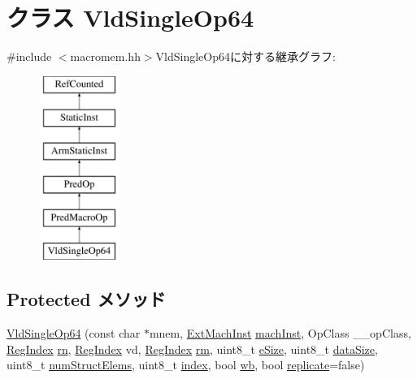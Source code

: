 \hypertarget{classArmISA_1_1VldSingleOp64}{
\section{クラス VldSingleOp64}
\label{classArmISA_1_1VldSingleOp64}
}


{\ttfamily \#include $<$macromem.hh$>$}VldSingleOp64に対する継承グラフ:\begin{figure}[H]
\begin{center}
\leavevmode
\includegraphics[height=6cm]{classArmISA_1_1VldSingleOp64}
\end{center}
\end{figure}
\subsection*{Protected メソッド}
\begin{DoxyCompactItemize}
\item 
\hyperlink{classArmISA_1_1VldSingleOp64_a61720536a7dbaa8cf1551561689ec645}{VldSingleOp64} (const char $\ast$mnem, \hyperlink{classStaticInst_a5605d4fc727eae9e595325c90c0ec108}{ExtMachInst} \hyperlink{classStaticInst_a744598b194ca3d4201d9414ce4cc4af4}{machInst}, OpClass \_\-\_\-opClass, \hyperlink{classStaticInst_a36d25e03e43fa3bb4c5482cbefe5e0fb}{RegIndex} \hyperlink{namespaceArmISA_adf8c6c579ad8729095a637a4f2181211}{rn}, \hyperlink{classStaticInst_a36d25e03e43fa3bb4c5482cbefe5e0fb}{RegIndex} vd, \hyperlink{classStaticInst_a36d25e03e43fa3bb4c5482cbefe5e0fb}{RegIndex} \hyperlink{namespaceArmISA_ad546c2cf2168cf2d8ac21b2a9f485e82}{rm}, uint8\_\-t \hyperlink{classArmISA_1_1VldSingleOp64_aac129ded07ba57383c5e2540f22c94ef}{eSize}, uint8\_\-t \hyperlink{classArmISA_1_1VldSingleOp64_af13e629a2f79d14821c7b9246ef99e9f}{dataSize}, uint8\_\-t \hyperlink{classArmISA_1_1VldSingleOp64_afb0be420b537599a5b86558127502040}{numStructElems}, uint8\_\-t \hyperlink{classArmISA_1_1VldSingleOp64_aae5a12e607d0f782506d9e6ec6179c64}{index}, bool \hyperlink{classArmISA_1_1VldSingleOp64_a93541ed16711b2c9c53cf093b675d90b}{wb}, bool \hyperlink{classArmISA_1_1VldSingleOp64_a8f2b56ecc4db4f48e2c08aef78591efc}{replicate}=false)
\end{DoxyCompactItemize}
